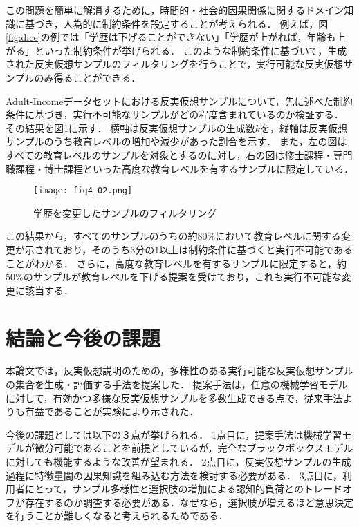 \documentclass[dvipdfmx]{jreport}
\begin{document}
この問題を簡単に解消するために，時間的・社会的因果関係に関するドメイン知識に基づき，人為的に制約条件を設定することが考えられる．
例えば，図\ref{fig:dice}の例では「学歴は下げることができない」「学歴が上がれば，年齢も上がる」といった制約条件が挙げられる．
このような制約条件に基づいて，生成された反実仮想サンプルのフィルタリングを行うことで，実行可能な反実仮想サンプルのみ得ることができる．

Adult-Incomeデータセットにおける反実仮想サンプルについて，先に述べた制約条件に基づき，実行不可能なサンプルがどの程度含まれているのか検証する．
その結果を図\ref{fig:4}に示す．
横軸は反実仮想サンプルの生成数$k$を，縦軸は反実仮想サンプルのうち教育レベルの増加や減少があった割合を示す．
また，左の図はすべての教育レベルのサンプルを対象とするのに対し，右の図は修士課程・専門職課程・博士課程といった高度な教育レベルを有するサンプルに限定している．

\begin{figure}[h]
    \begin{center}
        \texttt{[image: fig4\_02.png]} 
        \caption{学歴を変更したサンプルのフィルタリング} \label{fig:4}
    \end{center}
\end{figure}

この結果から，すべてのサンプルのうちの約80\%において教育レベルに関する変更が示されており，そのうち3分の1以上は制約条件に基づくと実行不可能であることがわかる．
さらに，高度な教育レベルを有するサンプルに限定すると，約50\%のサンプルが教育レベルを下げる提案を受けており，これも実行不可能な変更に該当する．

\section{結論と今後の課題}
本論文では，反実仮想説明のための，多様性のある実行可能な反実仮想サンプルの集合を生成・評価する手法を提案した．
提案手法は，任意の機械学習モデルに対して，有効かつ多様な反実仮想サンプルを多数生成できる点で，従来手法よりも有益であることが実験により示された．

今後の課題としては以下の３点が挙げられる．
1点目に，提案手法は機械学習モデルが微分可能であることを前提としているが，完全なブラックボックスモデルに対しても機能するような改善が望まれる．
2点目に，反実仮想サンプルの生成過程に特徴量間の因果知識を組み込む方法を検討する必要がある．
3点目に，利用者にとって，サンプル多様性と選択肢の増加による認知的負荷とのトレードオフが存在するのか調査する必要がある．なぜなら，選択肢が増えるほど意思決定を行うことが難しくなると考えられるためである．
\end{document}
